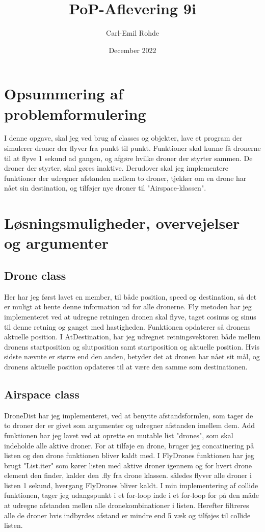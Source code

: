 \documentclass[a4paper]{article}
\title{PoP-Aflevering 9i}
\author{Carl-Emil Rohde}
\date{December 2022}
\begin{document}
\maketitle

\section*{Opsummering af problemformulering}
I denne opgave, skal jeg ved brug af classes og objekter, lave et program der simulerer droner der flyver fra punkt til punkt. Funktioner skal kunne få dronerne til at flyve 1 sekund ad gangen, og afgøre hvilke droner der styrter sammen. De droner der styrter, skal gøres inaktive. Derudover skal jeg implementere funktioner der udregner afstanden mellem to droner, tjekker om en drone har nået sin destination, og tilføjer nye droner til "Airspace-klassen".

\section*{Løsningsmuligheder, overvejelser og argumenter}
\subsection*{Drone class}
Her har jeg først lavet en member, til både position, speed og destination, så det er muligt at hente denne information ud for alle dronerne. Fly metoden har jeg implementeret ved at udregne retningen dronen skal flyve, taget cosinus og sinus til denne retning og ganget med hastigheden. Funktionen opdaterer så dronens aktuelle position. I AtDestination, har jeg udregnet retningsvektoren både mellem dronens startposition og slutposition samt startposition og aktuelle position. Hvis sidste nævnte er større end den anden, betyder det at dronen har nået sit mål, og dronens aktuelle position opdateres til at være den samme som destinationen.
\subsection*{Airspace class}
DroneDist har jeg implementeret, ved at benytte afstandsformlen, som tager de to droner der er givet som argumenter og udregner afstanden imellem dem. Add funktionen har jeg lavet ved at oprette en mutable list "drones", som skal indeholde alle aktive droner. For at tilføje en drone, bruger jeg concatinering på listen og den drone funktionen bliver kaldt med. I FlyDrones funktionen har jeg brugt "List.iter"   som kører listen med aktive droner igennem og for hvert drone element den finder, kalder den .fly fra drone klassen. således flyver alle droner i listen 1 sekund, hvergang FlyDrones bliver kaldt. I min implementering af collide funktionen, tager jeg udangspunkt i et for-loop inde i et for-loop for på den måde at udregne afstanden mellen alle dronekombinationer i listen. Herefter filtreres alle de droner hvis indbyrdes afstand er mindre end 5 væk og tilføjes til collide listen.
\end{document}
